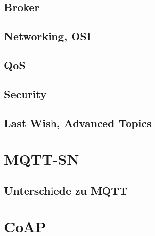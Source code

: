 \subsection{Broker}


\subsection{Networking, OSI}

\subsection{QoS}

\subsection{Security}

\subsection{Last Wish, Advanced Topics}

\section{MQTT-SN}

\subsection{Unterschiede zu MQTT}

\section{CoAP}